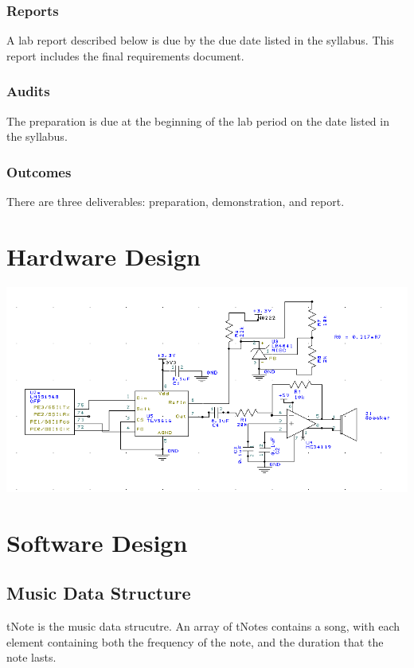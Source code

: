 \documentclass[twoside]{article}
\begin{document}
\subsubsection*{Reports} 
A lab report described below is due by the due date listed in the syllabus. This report includes the final requirements document. 
 
\subsubsection*{Audits} 
The preparation is due at the beginning of the lab period on the date listed in the syllabus. 
 
\subsubsection*{Outcomes}
There are three deliverables: preparation, demonstration, and report.

\section*{Hardware Design}
	\centerline{\includegraphics[width=\textwidth]{hardwareDesign_lab5PNG}}
    
\section*{Software Design}
\subsection*{Music Data Structure}
tNote is the music data strucutre. An array of tNotes contains a song, with each element containing both the frequency of the note, and the duration that the note lasts.
\end{document}
